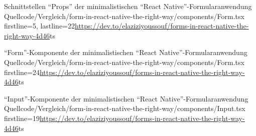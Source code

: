 \begin{fremdeslisting}{}{Schnittstellen \enquote{Props} der minimalistischen \enquote{React Native}-Formularanwendung}
  {Quellcode/Vergleich/form-in-react-native-the-right-way/components/Form.tsx}
  {firstline=5, lastline=22}{\url{https://dev.to/elaziziyoussouf/forms-in-react-native-the-right-way-4d46}}{ts}

  \label{lst:VergleichReactNatveForm}

\end{fremdeslisting}

\begin{fremdeslisting}{}{\enquote{Form}-Komponente der minimalistischen \enquote{React Native}-Formularanwendung}
	{Quellcode/Vergleich/form-in-react-native-the-right-way/components/Form.tsx}
	{firstline=24}{\url{https://dev.to/elaziziyoussouf/forms-in-react-native-the-right-way-4d46}}{ts}

	\label{lst:VergleichReactNatveForm2}

\end{fremdeslisting}

\begin{fremdeslisting}{}{\enquote{Input}-Komponente der minimalistischen \enquote{React Native}-Formularanwendung}
  {Quellcode/Vergleich/form-in-react-native-the-right-way/components/Input.tsx}
  {firstline=19}{\url{https://dev.to/elaziziyoussouf/forms-in-react-native-the-right-way-4d46}}{ts}

  \label{lst:VergleichReactNatveInput}
  
\end{fremdeslisting} 
